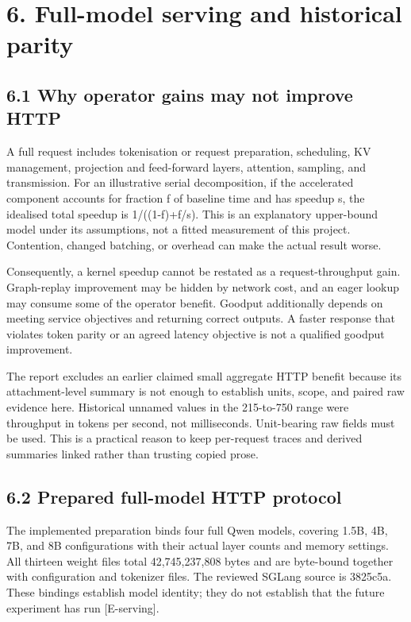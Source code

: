 \documentclass[11pt,a4paper]{article}
\begin{document}
\clearpage

\section*{6. Full-model serving and historical parity}


\subsection*{6.1 Why operator gains may not improve HTTP}

A full request includes tokenisation or request preparation, scheduling, KV management, projection and feed-forward layers, attention, sampling, and transmission. For an illustrative serial decomposition, if the accelerated component accounts for fraction f of baseline time and has speedup s, the idealised total speedup is 1/\allowbreak{}((1-f)+f/\allowbreak{}s). This is an explanatory upper-bound model under its assumptions, not a fitted measurement of this project. Contention, changed batching, or overhead can make the actual result worse.


Consequently, a kernel speedup cannot be restated as a request-throughput gain. Graph-replay improvement may be hidden by network cost, and an eager lookup may consume some of the operator benefit. Goodput additionally depends on meeting service objectives and returning correct outputs. A faster response that violates token parity or an agreed latency objective is not a qualified goodput improvement.


The report excludes an earlier claimed small aggregate HTTP benefit because its attachment-level summary is not enough to establish units, scope, and paired raw evidence here. Historical unnamed values in the 215-to-750 range were throughput in tokens per second, not milliseconds. Unit-bearing raw fields must be used. This is a practical reason to keep per-request traces and derived summaries linked rather than trusting copied prose.


\subsection*{6.2 Prepared full-model HTTP protocol}

The implemented preparation binds four full Qwen models, covering 1.5B, 4B, 7B, and 8B configurations with their actual layer counts and memory settings. All thirteen weight files total 42,745,237,808 bytes and are byte-bound together with configuration and tokenizer files. The reviewed SGLang source is 3825c5a. These bindings establish model identity; they do not establish that the future experiment has run [E-serving].
\end{document}

